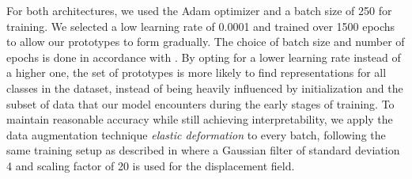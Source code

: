 For both architectures, we used the Adam optimizer \cite{adam} and a batch size of 250 for training. We selected a low learning rate of 0.0001 and trained over 1500 epochs to allow our prototypes to form gradually. The choice of batch size and number of epochs is done in accordance with \cite{li2018deep}. By opting for a lower learning rate instead of a higher one, the set of prototypes is more likely to find representations for all classes in the dataset, instead of being heavily influenced by initialization and the subset of data that our model encounters during the early stages of training. To maintain reasonable accuracy while still achieving interpretability, we apply the data augmentation technique \textit{elastic deformation} \citep{elasticdeformation} to every batch, following the same training setup as described in \citep{li2018deep} where a Gaussian filter of standard deviation 4 and scaling factor of 20 is used for the displacement field. 